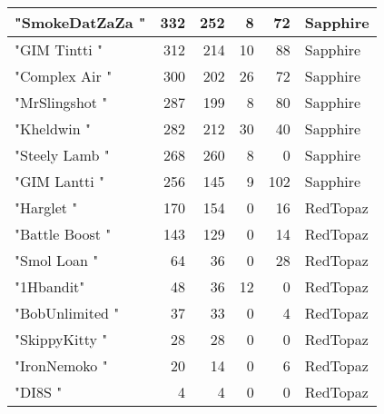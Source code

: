 \documentclass{article}
\begin{document}
\begin{table}[htbp]
\begin{tabular}{|l|r|r|r|r|l|}
"SmokeDatZaZa " & 332 & 252 & 8 & 72 & Sapphire \\ \hline
"GIM Tintti " & 312 & 214 & 10 & 88 & Sapphire \\ \hline
"Complex Air " & 300 & 202 & 26 & 72 & Sapphire \\ \hline
"MrSlingshot " & 287 & 199 & 8 & 80 & Sapphire \\ \hline
"Kheldwin " & 282 & 212 & 30 & 40 & Sapphire \\ \hline
"Steely Lamb " & 268 & 260 & 8 & 0 & Sapphire \\ \hline
"GIM Lantti " & 256 & 145 & 9 & 102 & Sapphire \\ \hline
"Harglet " & 170 & 154 & 0 & 16 & RedTopaz \\ \hline
"Battle Boost " & 143 & 129 & 0 & 14 & RedTopaz \\ \hline
"Smol Loan " & 64 & 36 & 0 & 28 & RedTopaz \\ \hline
"1Hbandit" & 48 & 36 & 12 & 0 & RedTopaz \\ \hline
"BobUnlimited " & 37 & 33 & 0 & 4 & RedTopaz \\ \hline
"SkippyKitty " & 28 & 28 & 0 & 0 & RedTopaz \\ \hline
"IronNemoko " & 20 & 14 & 0 & 6 & RedTopaz \\ \hline
"DI8S " & 4 & 4 & 0 & 0 & RedTopaz \\ \hline
\end{tabular}
\end{table}
\end{document}
